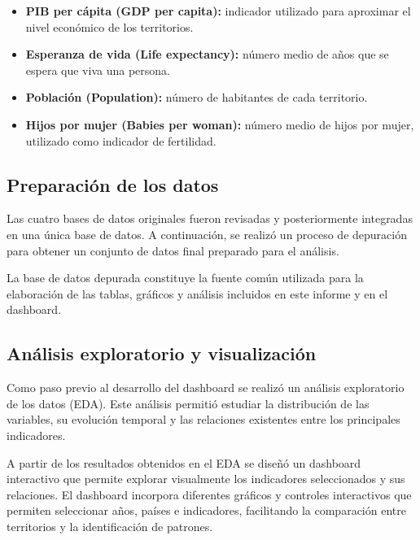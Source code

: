 \documentclass{article}
\begin{document}
\begin{itemize}

    \item \textbf{PIB per cápita (GDP per capita):} indicador utilizado
    para aproximar el nivel económico de los territorios.

    \item \textbf{Esperanza de vida (Life expectancy):} número medio de
    años que se espera que viva una persona.

    \item \textbf{Población (Population):} número de habitantes de cada
    territorio.

    \item \textbf{Hijos por mujer (Babies per woman):} número medio de
    hijos por mujer, utilizado como indicador de fertilidad.

\end{itemize}

\subsection{Preparación de los datos}

Las cuatro bases de datos originales fueron revisadas y posteriormente
integradas en una única base de datos. A continuación, se realizó un
proceso de depuración para obtener un conjunto de datos final preparado
para el análisis.

La base de datos depurada constituye la fuente común utilizada para la
elaboración de las tablas, gráficos y análisis incluidos en este informe
y en el dashboard.

\subsection{Análisis exploratorio y visualización}

Como paso previo al desarrollo del dashboard se realizó un análisis
exploratorio de los datos (EDA). Este análisis permitió estudiar la
distribución de las variables, su evolución temporal y las relaciones
existentes entre los principales indicadores.

A partir de los resultados obtenidos en el EDA se diseñó un dashboard
interactivo que permite explorar visualmente los indicadores seleccionados
y sus relaciones. El dashboard incorpora diferentes gráficos y controles
interactivos que permiten seleccionar años, países e indicadores,
facilitando la comparación entre territorios y la identificación de
patrones.
\end{document}
